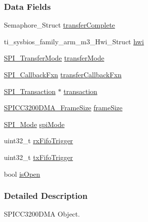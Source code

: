 \subsubsection*{Data Fields}
\begin{DoxyCompactItemize}
\item 
Semaphore\-\_\-\-Struct \hyperlink{struct_s_p_i_c_c3200_d_m_a___object_ab07247e7b5f2baec8911a504f971274c}{transfer\-Complete}
\item 
ti\-\_\-sysbios\-\_\-family\-\_\-arm\-\_\-m3\-\_\-\-Hwi\-\_\-\-Struct \hyperlink{struct_s_p_i_c_c3200_d_m_a___object_ae05d4c8510ccba7af93cbd1a1611f7c4}{hwi}
\item 
\hyperlink{_s_p_i_8h_ab9ea76c6529d6076eee5e1c4a5a92c6f}{S\-P\-I\-\_\-\-Transfer\-Mode} \hyperlink{struct_s_p_i_c_c3200_d_m_a___object_a4568c8868e1afad459d799a4f8e8f061}{transfer\-Mode}
\item 
\hyperlink{_s_p_i_8h_aeb03e7608a14021c3b0acf92c90e2168}{S\-P\-I\-\_\-\-Callback\-Fxn} \hyperlink{struct_s_p_i_c_c3200_d_m_a___object_a72099476a5531e0574c54b8ff03f973c}{transfer\-Callback\-Fxn}
\item 
\hyperlink{struct_s_p_i___transaction}{S\-P\-I\-\_\-\-Transaction} $\ast$ \hyperlink{struct_s_p_i_c_c3200_d_m_a___object_a6209f560b11300ad4b7d1dd6301faca7}{transaction}
\item 
\hyperlink{_s_p_i_c_c3200_d_m_a_8h_a886c3ca11a73823e4f3ab5eefc0fbebb}{S\-P\-I\-C\-C3200\-D\-M\-A\-\_\-\-Frame\-Size} \hyperlink{struct_s_p_i_c_c3200_d_m_a___object_a0eaf0b8282c07151b12ea19e5bd614be}{frame\-Size}
\item 
\hyperlink{_s_p_i_8h_a60a7e3d74577b38aa79ea6983362f942}{S\-P\-I\-\_\-\-Mode} \hyperlink{struct_s_p_i_c_c3200_d_m_a___object_a36697b1cbbbd6c4e5bfc79c76c7d6f91}{spi\-Mode}
\item 
uint32\-\_\-t \hyperlink{struct_s_p_i_c_c3200_d_m_a___object_aa78f596cf5149949066cda9c7f3af3d8}{rx\-Fifo\-Trigger}
\item 
uint32\-\_\-t \hyperlink{struct_s_p_i_c_c3200_d_m_a___object_a3c19a543c67b06c6da805c3bc4704212}{tx\-Fifo\-Trigger}
\item 
bool \hyperlink{struct_s_p_i_c_c3200_d_m_a___object_a77470787fc1b5ff28bed24d4be19b3d2}{is\-Open}
\end{DoxyCompactItemize}


\subsubsection{Detailed Description}
S\-P\-I\-C\-C3200\-D\-M\-A Object. 

